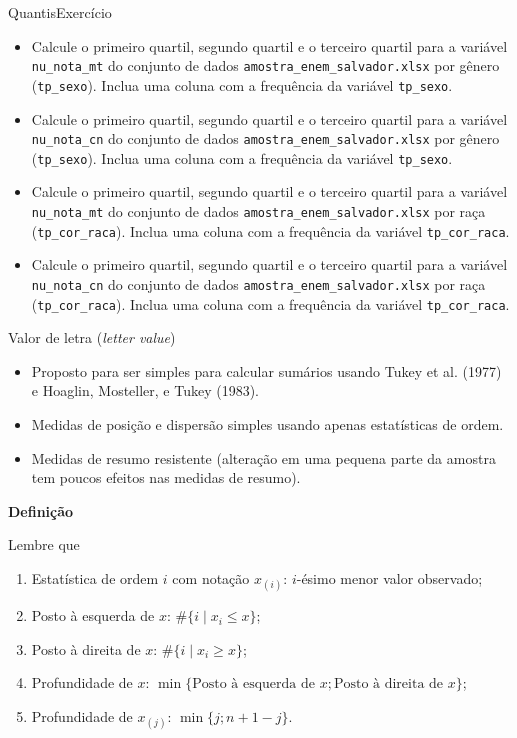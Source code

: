 \documentclass[
  10pt,
  ignorenonframetext,
]{beamer}
\providecommand{\tightlist}{%
  \setlength{\itemsep}{0pt}\setlength{\parskip}{0pt}}\usepackage{longtable,booktabs,array}
\begin{document}
\begin{frame}[fragile]{Quantis\newline Exercício}
\protect\hypertarget{quantisexercuxedcio}{}
\begin{itemize}
\tightlist
\item
  Calcule o primeiro quartil, segundo quartil e o terceiro quartil para
  a variável \texttt{nu\_nota\_mt} do conjunto de dados
  \texttt{amostra\_enem\_salvador.xlsx} por gênero (\texttt{tp\_sexo}).
  Inclua uma coluna com a frequência da variável \texttt{tp\_sexo}.
\item
  Calcule o primeiro quartil, segundo quartil e o terceiro quartil para
  a variável \texttt{nu\_nota\_cn} do conjunto de dados
  \texttt{amostra\_enem\_salvador.xlsx} por gênero (\texttt{tp\_sexo}).
  Inclua uma coluna com a frequência da variável \texttt{tp\_sexo}.
\item
  Calcule o primeiro quartil, segundo quartil e o terceiro quartil para
  a variável \texttt{nu\_nota\_mt} do conjunto de dados
  \texttt{amostra\_enem\_salvador.xlsx} por raça
  (\texttt{tp\_cor\_raca}). Inclua uma coluna com a frequência da
  variável \texttt{tp\_cor\_raca}.
\item
  Calcule o primeiro quartil, segundo quartil e o terceiro quartil para
  a variável \texttt{nu\_nota\_cn} do conjunto de dados
  \texttt{amostra\_enem\_salvador.xlsx} por raça
  (\texttt{tp\_cor\_raca}). Inclua uma coluna com a frequência da
  variável \texttt{tp\_cor\_raca}.
\end{itemize}
\end{frame}

\begin{frame}{Valor de letra (\emph{letter value})}
\protect\hypertarget{valor-de-letra-letter-value}{}
\begin{itemize}
\tightlist
\item
  Proposto para ser simples para calcular sumários usando Tukey et al.
  (1977) e Hoaglin, Mosteller, e Tukey (1983).
\item
  Medidas de posição e dispersão simples usando apenas estatísticas de
  ordem.
\item
  Medidas de resumo resistente (alteração em uma pequena parte da
  amostra tem poucos efeitos nas medidas de resumo).
\end{itemize}

\textbf{Definição}

Lembre que

\begin{enumerate}
\tightlist
\item
  Estatística de ordem \(i\) com notação \(x_{(i)}\): \(i\)-ésimo menor
  valor observado;
\item
  Posto à esquerda de \(x\): \(\#\{i \mid x_i \leq x\}\);
\item
  Posto à direita de \(x\): \(\#\{i \mid x_i \geq x\}\);
\item
  Profundidade de \(x\):
  \(\min\{\text{Posto à esquerda de }x; \text{Posto à direita de }x\}\);
\item
  Profundidade de \(x_{(j)}\): \(\min\{j; n+1-j\}\).
\end{enumerate}
\end{frame}
\end{document}
